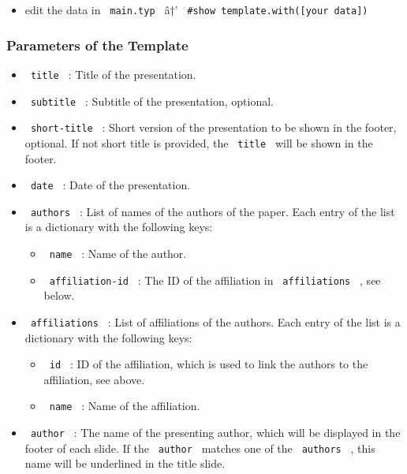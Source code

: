 \begin{Shaded}
\begin{Highlighting}[]
\end{Highlighting}
\end{Shaded}

\begin{itemize}
\tightlist
\item
  edit the data in \texttt{\ main.typ\ } â†'
  \texttt{\ \#show\ template.with({[}your\ data{]})\ }
\end{itemize}

\subsubsection{Parameters of the
Template}\label{parameters-of-the-template}

\begin{itemize}
\tightlist
\item
  \texttt{\ title\ } : Title of the presentation.
\item
  \texttt{\ subtitle\ } : Subtitle of the presentation, optional.
\item
  \texttt{\ short-title\ } : Short version of the presentation to be
  shown in the footer, optional. If not short title is provided, the
  \texttt{\ title\ } will be shown in the footer.
\item
  \texttt{\ date\ } : Date of the presentation.
\item
  \texttt{\ authors\ } : List of names of the authors of the paper. Each
  entry of the list is a dictionary with the following keys:

  \begin{itemize}
  \tightlist
  \item
    \texttt{\ name\ } : Name of the author.
  \item
    \texttt{\ affiliation-id\ } : The ID of the affiliation in
    \texttt{\ affiliations\ } , see below.
  \end{itemize}
\item
  \texttt{\ affiliations\ } : List of affiliations of the authors. Each
  entry of the list is a dictionary with the following keys:

  \begin{itemize}
  \tightlist
  \item
    \texttt{\ id\ } : ID of the affiliation, which is used to link the
    authors to the affiliation, see above.
  \item
    \texttt{\ name\ } : Name of the affiliation.
  \end{itemize}
\item
  \texttt{\ author\ } : The name of the presenting author, which will be
  displayed in the footer of each slide. If the \texttt{\ author\ }
  matches one of the \texttt{\ authors\ } , this name will be underlined
  in the title slide.
\end{itemize}

